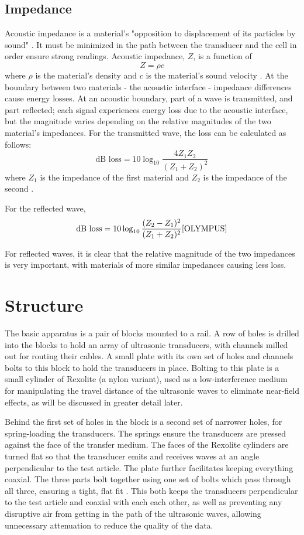 \subsection{Impedance}
Acoustic impedance is a material's "opposition to displacement of its particles by sound" \cite{OLYMPUS}. It must be minimized in the path between the transducer and the cell in order ensure strong readings. Acoustic impedance, $Z$, is a function of
$$ Z = \rho c$$
where $\rho$ is the material's density and $c$ is the material's sound velocity \cite{OLYMPUS}.
At the boundary between two materials - the acoustic interface - impedance differences cause energy losses. At an acoustic boundary, part of a wave is transmitted, and part reflected; each signal experiences energy loss due to the acoustic interface, but the magnitude varies depending on the relative magnitudes of the two material's impedances.
For the transmitted wave, the loss can be calculated as follows:
$$ \text{dB loss} = 10 \log_{10} \frac{4Z_1 Z_2}{(Z_1 + Z_2)^2}$$
where $Z_1$ is the impedance of the first material and $Z_2$ is the impedance of the second \cite{OLYMPUS}.

For the reflected wave, 
$$\text{dB loss} = 10\log_{10} \frac{(Z_2 - Z_1)^2}{(Z_1 + Z_2)^2} \cite{OLYMPUS}$$

For reflected waves, it is clear that the relative magnitude of the two impedances is very important, with materials of more similar impedances causing less loss.

\section{Structure}

The basic apparatus is a pair of blocks mounted to a rail. A row of holes is drilled into the blocks to hold an array of ultrasonic transducers, with channels milled out for routing their cables. A small plate with its own set of holes and channels bolts to this block to hold the transducers in place. Bolting to this plate is a small cylinder of Rexolite (a nylon variant), used as a low-interference medium for manipulating the travel distance of the ultrasonic waves to eliminate near-field effects, as will be discussed in greater detail later.

Behind the first set of holes in the block is a second set of narrower holes, for spring-loading the transducers. The springs ensure the transducers are pressed against the face of the transfer medium. The faces of the Rexolite cylinders are turned flat so that the transducer emits and receives waves at an angle perpendicular to the test article.  The plate further facilitates keeping everything coaxial. The three parts bolt together using one set of bolts which pass through all three, ensuring a tight, flat fit . This both keeps the transducers perpendicular to the test article and coaxial with each each other, as well as preventing any disruptive air from getting in the path of the ultrasonic waves, allowing unnecessary attenuation to reduce the quality of the data. 

